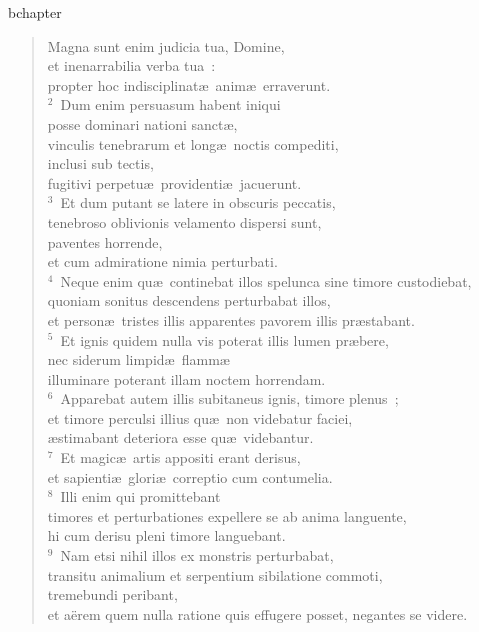 bchapter\begin{verse}\vspace{-19pt}Magna sunt enim judicia tua, Domine,\\ et inenarrabilia verba tua~:\\ propter hoc indisciplinat\ae\ anim\ae\ erraverunt.\\
${}^{2}$~Dum enim persuasum habent iniqui\\ posse dominari nationi sanct\ae ,\\ vinculis tenebrarum et long\ae\ noctis compediti,\\ inclusi sub tectis,\\ fugitivi perpetu\ae\ providenti\ae\ jacuerunt.\\
${}^{3}$~Et dum putant se latere in obscuris peccatis,\\ tenebroso oblivionis velamento dispersi sunt,\\ paventes horrende,\\ et cum admiratione nimia perturbati.\\
${}^{4}$~Neque enim qu\ae\ continebat illos spelunca sine timore custodiebat,\\ quoniam sonitus descendens perturbabat illos,\\ et person\ae\ tristes illis apparentes pavorem illis pr\ae stabant.\\
${}^{5}$~Et ignis quidem nulla vis poterat illis lumen pr\ae bere,\\ nec siderum limpid\ae\ flamm\ae \\ illuminare poterant illam noctem horrendam.\\
${}^{6}$~Apparebat autem illis subitaneus ignis, timore plenus~;\\ et timore perculsi illius qu\ae\ non videbatur faciei,\\ \ae stimabant deteriora esse qu\ae\ videbantur.\\
${}^{7}$~Et magic\ae\ artis appositi erant derisus,\\ et sapienti\ae\ glori\ae\ correptio cum contumelia.\\
${}^{8}$~Illi enim qui promittebant\\ timores et perturbationes expellere se ab anima languente,\\ hi cum derisu pleni timore languebant.\\
${}^{9}$~Nam etsi nihil illos ex monstris perturbabat,\\ transitu animalium et serpentium sibilatione commoti,\\ tremebundi peribant,\\ et a\"erem quem nulla ratione quis effugere posset, negantes se videre.\\

\end{verse}
